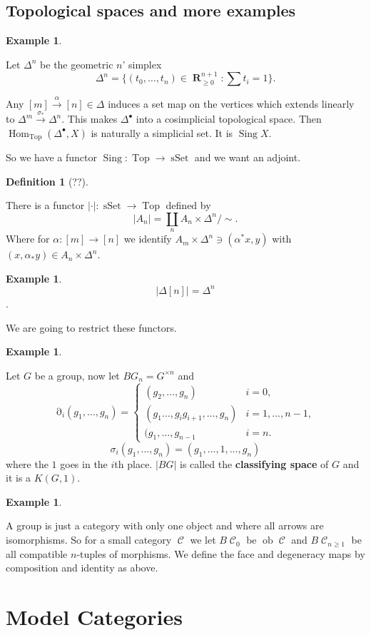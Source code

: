 \documentclass[10pt,]{book}
\newcommand{\terminology}[1]{\textbf{#1}}
\theoremstyle{plain}
\theoremstyle{definition}
\newtheorem{definition}[theorem]{Definition}
\newtheorem{example}[theorem]{Example}
\numberwithin{equation}{section}
\DeclareMathOperator{\Hom}{Hom}
\DeclareMathOperator{\ob}{ob}
\DeclareMathOperator{\Sing}{Sing}
\DeclareMathOperator{\Top}{\text{Top}}
\DeclareMathOperator{\sSet}{\text{sSet}}
\DeclareMathOperator{\cC}{\mathcal{C}}
\DeclareMathOperator{\dd}{\partial}
\DeclareMathOperator{\RR}{\mathbf{R}}
\begin{document}
\section[Topological spaces and more examples]{Topological spaces and more examples}\label{sec-top-examples}
\begin{example}\label{example-19}

            Let \(\Delta^n\) be the geometric \(n\)' simplex
            \[\Delta^n = \{(t_0,\ldots,t_n) \in \RR_{\ge 0}^{n+1} : \sum t_i = 1\}.\]

            Any \([m]\xrightarrow{\alpha} [n] \in \Delta\) induces a set map on the vertices which extends linearly to \(\Delta^m \xrightarrow{\sigma_*} \Delta^n\).
            This makes \(\Delta^{\bullet}\) into a cosimplicial topological space.
            Then \(\Hom_{\Top}(\Delta^{\bullet}, X)\) is naturally a simplicial set.
            It is \(\Sing X\).

            So we have a functor \(\Sing \colon \Top \to \sSet\) and we want an adjoint.
          \end{example}
\begin{definition}[??]\label{definition-28}

            There is a functor \(|\cdot |\colon \sSet \to \Top\) defined by
            \[
              |A_n| = \coprod_n A_n \times \Delta^n / \sim.
            \]
            Where for \(\alpha \colon [m] \to [n]\) we identify \(A_m \times \Delta^n \ni (\alpha^* x, y)\) with \((x, \alpha_* y) \in A_n \times \Delta^n\).
          \end{definition}
\begin{example}\label{example-20}
\[|\Delta[n]| = \Delta^n\].
          \end{example}

          We are going to restrict these functors.
\begin{example}\label{example-21}

            Let \(G\) be a group, now let \(BG_n = G^{\times n}\) and
            \[\dd_i(g_1,\ldots,g_n) = \begin{cases}(g_2,\ldots,g_n) & i = 0, \\(g_1\ldots,g_ig_{i+1},\ldots,g_n) & i = 1,\ldots,n-1,\\(g_1,\ldots,g_{n-1} & i = n.\end{cases}\]\[\sigma_i(g_1,\ldots,g_n) = (g_1,\ldots,1,\ldots,g_n)\]
            where the \(1\) goes in the \(i\)th place.
            \(|BG|\) is called the \terminology{classifying space} of \(G\) and it is a \(K(G,1)\).
          \end{example}
\begin{example}\label{example-22}

            A group is just a category with only one object and where all arrows are isomorphisms.
            So for a small category \(\cC\) we let \(B\cC_0\) be \(\ob \cC\) and \(B\cC_{n\ge 1}\) be all compatible \(n\)-tuples of morphisms.
            We define the face and degeneracy maps by composition and identity as above.
          \end{example}
\typeout{************************************************}
\typeout{************************************************}
\chapter[Model Categories]{Model Categories}\label{chap-model-cats}
%
\backmatter
%
\end{document}
